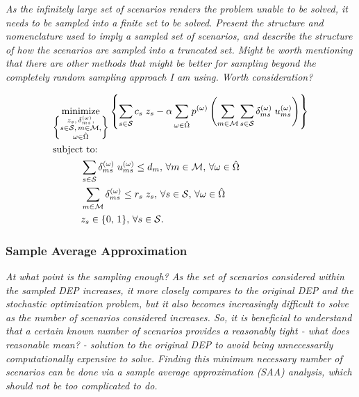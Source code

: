 \documentclass[12pt,dvipsnames]{report}
\begin{document}
\textit{As the infinitely large set of scenarios renders the problem unable to be solved, it needs to be sampled into a finite set to be solved.  Present the structure and nomenclature used to imply a sampled set of scenarios, and describe the structure of how the scenarios are sampled into a truncated set.  Might be worth mentioning that there are other methods that might be better for sampling beyond the completely random sampling approach I am using.  Worth consideration?}

\begin{tcolorbox}[floatplacement = !ht, float, title = Problem 3 -- Sampled Deterministic Equivalent Program (sDEP)]
\begin{align}
& \underset{\left\{ \substack{
	z_s,\, \delta_{ms}^{(\omega)},\\
	s \in \mathcal{S},\, m \in \mathcal{M},\\
	\omega \in \hat{\Omega}} \right\}} {\text{minimize}}
\left\{ \sum_{s \in \mathcal{S}} c_s \; z_s - \alpha \sum_{\omega \in \hat{\Omega}} p^{(\omega)} \left( \sum_{m \in \mathcal{M}} \sum_{s \in \mathcal{S}} \delta_{ms}^{(\omega)} \; u_{ms}^{(\omega)} \right) \right\} \label{eq:sDEPO}\\
& \text{subject to:}  \nonumber \\
& \hspace{0.4in} \sum_{s \in \mathcal{S}} \delta_{ms}^{(\omega)} \; u_{ms}^{(\omega)} \leq d_m,\, \forall m \in \mathcal{M},\, \forall \omega \in \hat{\Omega} \label{eq:sDEPC1}\\
& \hspace{0.4in} \sum_{m \in \mathcal{M}} \delta_{ms}^{(\omega)} \leq r_s \; z_s,\, \forall s \in \mathcal{S},\, \forall \omega \in \hat{\Omega} \label{eq:sDEPC2}\\
& \hspace{0.4in} z_s \in \{0,\, 1\},\, \forall s \in \mathcal{S}. \label{eq:sDEPC3}
\end{align}
\end{tcolorbox}

\subsubsection{Sample Average Approximation} \label{subsubsec:dep_sampling_saa}

\textit{At what point is the sampling enough?  As the set of scenarios considered within the sampled DEP increases, it more closely compares to the original DEP and the stochastic optimization problem, but it also becomes increasingly difficult to solve as the number of scenarios considered increases.  So, it is beneficial to understand that a certain known number of scenarios provides a reasonably tight - what does reasonable mean? - solution to the original DEP to avoid being unnecessarily computationally expensive to solve.  Finding this minimum necessary number of scenarios can be done via a sample average approximation (SAA) analysis, which should not be too complicated to do.}
\end{document}
